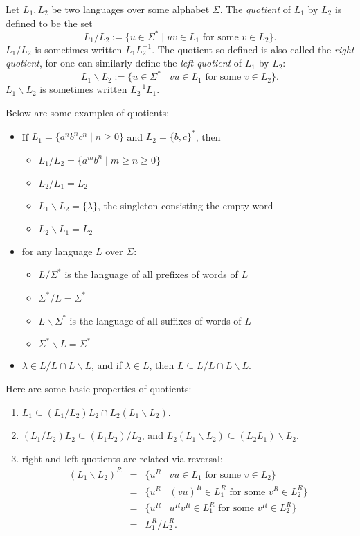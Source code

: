 \documentclass[12pt]{article}
\begin{document}
Let $L_1,L_2$ be two languages over some alphabet $\Sigma$.  The \emph{quotient} of $L_1$ by $L_2$ is defined to be the set $$L_1/L_2:=\lbrace u \in \Sigma^* \mid uv \in L_1 \mbox{ for some } v\in L_2\rbrace.$$ $L_1/L_2$ is sometimes written $L_1 L_2^{-1}$.  The quotient so defined is also called the \emph{right quotient}, for one can similarly define the \emph{left quotient} of $L_1$ by $L_2$: $$L_1\backslash L_2:= \lbrace u\in \Sigma^* \mid vu \in L_1 \mbox{ for some } v\in L_2 \rbrace.$$  $L_1\backslash L_2$ is sometimes written $L_2^{-1} L_1$.

Below are some examples of quotients:
\begin{itemize}
\item If $L_1 = \lbrace a^n b^n c^n \mid n\ge 0\rbrace$ and $L_2 = \lbrace b,c\rbrace^*$, then 
\begin{itemize}
\item $L_1 / L_2 = \lbrace a^m b^n \mid m\ge n \ge 0 \rbrace$
\item $L_2 / L_1 = L_2$
\item $L_1 \backslash L_2 = \lbrace \lambda \rbrace$, the singleton consisting the empty word
\item $L_2 \backslash L_1 = L_2$
\end{itemize}
\item for any language $L$ over $\Sigma$:
\begin{itemize}
\item $L / \Sigma^*$ is the language of all prefixes of words of $L$
\item $\Sigma^* / L = \Sigma^*$
\item $L \backslash \Sigma^*$ is the language of all suffixes of words of $L$
\item $\Sigma^* \backslash L = \Sigma^*$
\end{itemize}
\item $\lambda \in L/L \cap L\backslash L$, and if $\lambda \in L$, then $L \subseteq L/L \cap L\backslash L$.
\end{itemize}

Here are some basic properties of quotients:
\begin{enumerate}
\item $L_1 \subseteq (L_1 / L_2)L_2 \cap L_2 (L_1 \backslash L_2)$.
\item $(L_1/L_2)L_2 \subseteq (L_1L_2)/L_2$, and $L_2 (L_1 \backslash L_2) \subseteq (L_2L_1) \backslash L_2$.
\item right and left quotients are related via reversal:
\begin{eqnarray*}
(L_1\backslash L_2)^R &=& \lbrace u^R \mid vu \in L_1 \mbox{ for some } v\in L_2 \rbrace \\ 
&=& \lbrace u^R \mid (vu)^R \in L_1^R \mbox{ for some } v^R \in L_2^R \rbrace \\ 
&=& \lbrace u^R \mid u^Rv^R \in L_1^R \mbox{ for some } v^R \in L_2^R \rbrace \\ 
&=& L_1^R / L_2^R.
\end{eqnarray*}
\end{enumerate}
\end{document}
